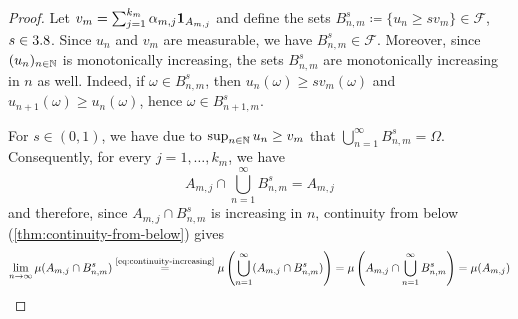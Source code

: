 \begin{proof}
Let $v_m = \sum_{j=1}^{k_m}\alpha_{m,j}\mathbf{1}_{A_{m,j}}$ and define the sets $B_{n,m}^s \coloneq \{u_n \geq sv_m\} \in \mathcal{F}$, $s \in 3.8$.
Since $u_n$ and $v_m$ are measurable, we have $B_{n,m}^s \in \mathcal{F}$.
Moreover, since $(u_n)_{n \in \mathbb{N}}$ is monotonically increasing, the sets $B_{n,m}^s$ are monotonically increasing in $n$ as well.
Indeed, if $\omega \in B_{n,m}^s$, then $u_n(\omega) \geq sv_m(\omega)$ and $u_{n+1}(\omega) \geq u_n(\omega)$, hence $\omega \in B_{n+1,m}^s$.


For $s \in (0,1)$, we have due to $\sup_{n \in \mathbb{N}}u_n \geq v_m$ that
\(
\bigcup_{n = 1}^{\infty} B_{n,m}^s
=
\Omega
\).
Consequently, for every $j=1,\ldots,k_m$, we have
\[
A_{m,j}
\cap
\bigcup_{n = 1}^{\infty} B_{n,m}^s
=
A_{m,j}
\]
and therefore, since $A_{m,j}\cap B_{n,m}^s$ is increasing in $n$, continuity from below (\autoref{thm:continuity-from-below}) gives
\begin{equation}\label{proof:integral-independent-of-approximating-sequence:continuity-from-below-application}
\lim_{n \to \infty}\mu(A_{m,j}\cap B_{n,m}^s)
\overset{\text{\eqref{eq:continuity-increasing}}}{=}
\mu\left(\bigcup_{n = 1}^{\infty}(A_{m,j}\cap B_{n,m}^s)\right)
=
\mu\left(A_{m,j}\cap\bigcup_{n = 1}^{\infty}B_{n,m}^s\right)
=
\mu(A_{m,j})
\end{equation}


\end{proof}
